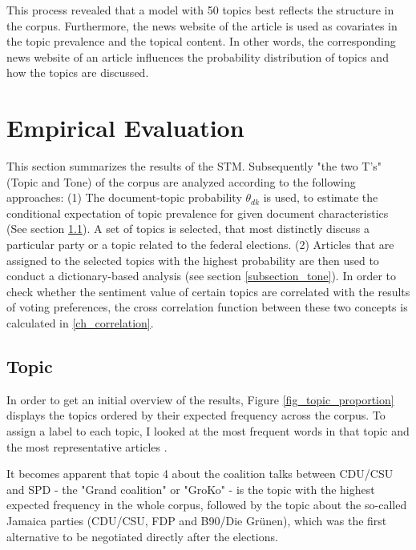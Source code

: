 \documentclass[12pt,a4paper,notitlepage]{article}
\begin{document}
This process revealed that a model with 50 topics best reflects the structure in the corpus. Furthermore, the news website of the article is used as covariates in the topic prevalence and the topical content. In other words, the corresponding news website of an article influences the probability distribution of topics and how the topics are discussed. 

\section{Empirical Evaluation}\label{ch_empirical}

This section summarizes the results of the STM. Subsequently "the two T's" (Topic and Tone) of the corpus are analyzed according to the following approaches: (1) The document-topic probability $\theta_{dk}$ is used, to estimate the conditional expectation of topic prevalence for given document characteristics (See section \ref{subsection_topic}). A set of topics is selected, that most distinctly discuss a particular party or a topic related to the federal elections. (2) Articles that are assigned to the selected topics with the highest probability are then used to conduct a dictionary-based analysis (see section \ref{subsection_tone}). In order to check whether the sentiment value of certain topics are correlated with the results of voting preferences, the cross correlation function between these two concepts is calculated in \ref{ch_correlation}.

\subsection{Topic}\label{subsection_topic}

In order to get an initial overview of the results, Figure \ref{fig_topic_proportion} displays the topics ordered by their expected frequency across the corpus. To assign a label to each topic, I looked at the most frequent words in that topic and the most representative articles \citep{roberts_model_2016}. 

It becomes apparent that topic 4 about the coalition talks between CDU/CSU and SPD - the "Grand coalition" or "GroKo" - is the topic with the highest expected frequency in the whole corpus, followed by the topic about the so-called Jamaica parties (CDU/CSU, FDP and B90/Die Grünen), which was the first alternative to be negotiated directly after the elections.  
\end{document}
